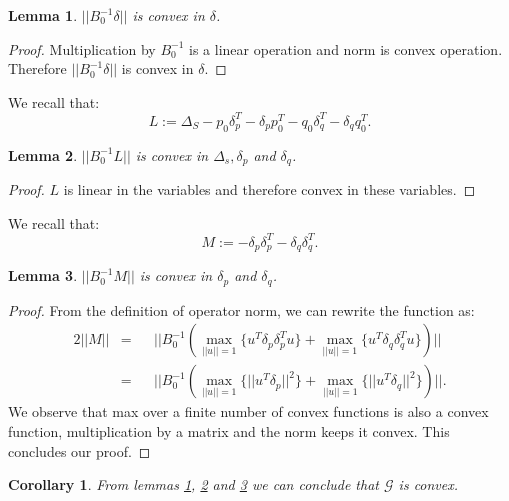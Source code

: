 \documentclass{sig-alternate-05-2015}
\newtheorem{lemma}{Lemma}
\newtheorem{corollary}{Corollary}
\begin{document}
\begin{lemma} \label{delta}
$||B_0^{-1}\delta||$ is convex in $\delta$.
\end{lemma}
\begin{proof}
Multiplication by $B_0^{-1}$ is a linear operation and norm is convex
operation. Therefore $||B_0^{-1}\delta||$ is convex in $\delta$.
\end{proof}

We recall that:
\begin{equation*}
L:= \Delta_S - p_0\delta_p^T - \delta_pp_0^T - q_0\delta_q^T - \delta_qq_0^T.
\end{equation*}
\begin{lemma} \label{L}
$||B_0^{-1}L||$ is convex in $\Delta_s, \delta_p$
and $\delta_q$.
\end{lemma}
\begin{proof}
$L$ is linear in the variables and therefore convex in these variables.

\end{proof}

We recall that:
\begin{equation*}
M:= - \delta_p\delta_p^T - \delta_q\delta_q^T.
\end{equation*}

\begin{lemma} \label{M}
$||B_0^{-1}M||$ is convex in $\delta_p$
and $\delta_q$.
\end{lemma}
\begin{proof}
From the definition of operator norm, we can rewrite the function as:
\begin{alignat*} {2}
||M|| & = && ||B_0^{-1}(\max_{||u||=1}{\{u^T \delta_p\delta_p^T u\}} +
\max_{||u||=1}{\{u^T \delta_q\delta_q^T u\}})||\\
& = && ||B_0^{-1}(\max_{||u||=1}{\{||u^T \delta_p||^2\}} +
\max_{||u||=1}{\{||u^T \delta_q||^2\}})||.
\end{alignat*}
We observe that max over a finite number of convex functions is also a convex
function, multiplication by a matrix and the norm keeps it convex.
This concludes our proof.
\end{proof}

\begin{corollary}
From lemmas \ref{delta}, \ref{L} and \ref{M} we can conclude that $\mathcal{G}$
is convex.
\end{corollary}
\end{document}
